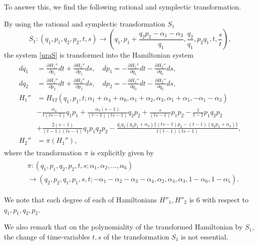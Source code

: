 To answer this, we find the following rational and symplectic transformation.
\begin{thm}\label{th:ininoka}
By using the rational and symplectic transformation $S_1$
\begin{equation}
S_1:(q_1,p_1,q_2,p_2,t,s) \rightarrow \left(q_1,p_1+\frac{q_2p_2-\alpha_1-\alpha_3}{q_1},\frac{q_2}{q_1},p_2q_1,t,\frac{s}{t}\right),
\end{equation}
the system \eqref{uraS} is transformed into the Hamiltonian system
\begin{align}\label{urauraS}
\begin{split}
dq_1&=\frac{\partial H_1''}{\partial p_1}dt+\frac{\partial H_2''}{\partial p_1}ds, \quad dp_1=-\frac{\partial H_1''}{\partial q_1}dt-\frac{\partial H_2''}{\partial q_1}ds,\\
dq_2&=\frac{\partial H_1''}{\partial p_2}dt+\frac{\partial H_2''}{\partial p_2}ds, \quad dp_2=-\frac{\partial H_1''}{\partial q_2}dt-\frac{\partial H_2''}{\partial q_2}ds,\\
H_1'' &=H_{VI}(q_1,p_1,t;\alpha_1+\alpha_4+\alpha_6,\alpha_1+\alpha_2,\alpha_3,\alpha_1+\alpha_5,-\alpha_1-\alpha_3)\\
&-\frac{\alpha_4}{t(ts-1)}q_1p_1+\frac{\alpha_3(s-1)}{(t-1)(ts-1)}q_2p_2+\frac{s}{(ts-1)}p_1p_2-\frac{1}{t-1}p_1q_2p_2\\
&+\frac{2(s-1)}{(t-1)(ts-1)}q_1p_1q_2p_2-\frac{q_1q_2(q_1p_1+\alpha_3)\{(ts-1)p_2-(t-1)(q_2p_2+\alpha_4)\}}{t(t-1)(ts-1)},\\
H_2'' &=\pi(H_1''),
\end{split}
\end{align}
where the transformation $\pi$ is explicitly given by
\begin{align}
\begin{split}
&\pi:(q_1,p_1,q_2,p_2,t,s;\alpha_1,\alpha_2, \dots ,\alpha_6)\\
&\rightarrow (q_2,p_2,q_1,p_1,s,t;-\alpha_1-\alpha_2-\alpha_3-\alpha_4,\alpha_2,\alpha_4,\alpha_3,1-\alpha_6,1-\alpha_5).
\end{split}
\end{align}
\end{thm}
We note that each degree of each of Hamiltonians $H''_1,H''_2$ is 6 with respect to $q_1,p_1,q_2,p_2$.

We also remark that on the polynomiality of the transformed Hamiltonian by $S_1$, the change of time-variables $t,s$ of the transformation $S_1$ is not essential.



